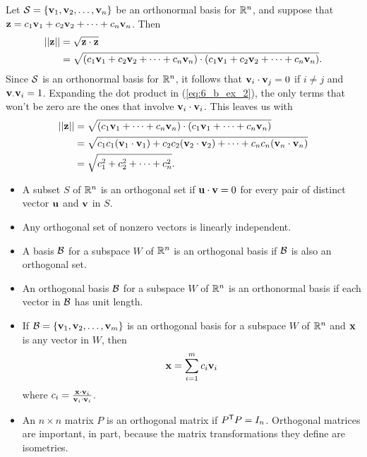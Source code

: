 \begin{example}
\item Let $\mathcal{S} = \{\mathbf{v}_1, \mathbf{v}_2, \ldots, \mathbf{v}_n\}$ be an orthonormal basis for $\mathbb{R}^n$, and suppose that $\mathbf{z} = c_1\mathbf{v}_1 + c_2 \mathbf{v}_2 + \cdots + c_n \mathbf{v}_n$. Then
\begin{align}
|| \mathbf{z} || &= \sqrt{\mathbf{z} \cdot \mathbf{z}} \notag  \\
	&= \sqrt{ (c_1\mathbf{v}_1 + c_2 \mathbf{v}_2 + \cdots + c_n \mathbf{v}_n) \cdot (c_1\mathbf{v}_1 + c_2 \mathbf{v}_2 + \cdots + c_n \mathbf{v}_n)}. \label{eq:6_b_ex_2}
\end{align}
Since $\mathcal{S}$ is an orthonormal basis for $\mathbb{R}^n$, it follows that $\mathbf{v}_i \cdot \mathbf{v}_j = 0$ if $i \neq j$ and $\mathbf{v}_ \cdot \mathbf{v}_i = 1$. Expanding the dot product in (\ref{eq:6_b_ex_2}), the only terms that won't be zero are the ones that involve $\mathbf{v}_i \cdot \mathbf{v}_i$. This leaves us with 
\begin{align*}
|| \mathbf{z} || &=  \sqrt{ (c_1\mathbf{v}_1 + \cdots + c_n \mathbf{v}_n) \cdot (c_1\mathbf{v}_1 + \cdots + c_n \mathbf{v}_n)} \\
	&= \sqrt{c_1c_1 (\mathbf{v}_1 \cdot \mathbf{v}_1) + c_2c_2 (\mathbf{v}_2 \cdot \mathbf{v}_2) + \cdots + c_nc_n (\mathbf{v}_n \cdot \mathbf{v}_n)} \\
	&= \sqrt{c_1^2+c_2^2 + \cdots + c_n^2}.
\end{align*}


\ea

\end{example}

\label{sec:orthog_set_summ}
\begin{itemize}
\item A subset $S$ of $\mathbb{R}^n$ is an orthogonal set if $\mathbf{u} \cdot \mathbf{v} = 0$ for every pair of distinct vector $\mathbf{u}$ and $\mathbf{v}$ in $S$.
\item Any orthogonal set of nonzero vectors is linearly independent. 
\item A basis $\mathcal{B}$ for a subspace $W$ of $\mathbb{R}^n$ is an orthogonal basis if $\mathcal{B}$ is also an orthogonal set.
\item An orthogonal basis $\mathcal{B}$ for a subspace $W$ of $\mathbb{R}^n$ is an orthonormal basis if each vector in $\mathcal{B}$ has unit length.
\item If $\mathcal{B} = \{\mathbf{v}_1, \mathbf{v}_2, \ldots, \mathbf{v}_m\}$ is an orthogonal basis for a subspace $W$ of $\mathbb{R}^n$ and $\mathbf{x}$ is any vector in $W$, then
\[\mathbf{x} = \sum_{i=1}^m c_i \mathbf{v}_i\]
where $c_i = \frac{\mathbf{x} \cdot \mathbf{v}_i}{\mathbf{v}_i \cdot \mathbf{v}_i}$.
\item An $n \times n$ matrix $P$ is an orthogonal matrix if $P^{\mathsf{T}}P = I_n$. Orthogonal matrices are important, in part, because the matrix transformations they define are isometries. 
\end{itemize}


